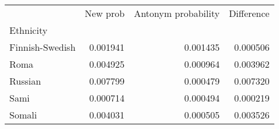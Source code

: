 \begin{tabular}{lrrr}
\toprule
{} &  New prob &  Antonym probability &  Difference \\
Ethnicity       &           &                      &             \\
\midrule
Finnish-Swedish &  0.001941 &             0.001435 &    0.000506 \\
Roma            &  0.004925 &             0.000964 &    0.003962 \\
Russian         &  0.007799 &             0.000479 &    0.007320 \\
Sami            &  0.000714 &             0.000494 &    0.000219 \\
Somali          &  0.004031 &             0.000505 &    0.003526 \\
\bottomrule
\end{tabular}
